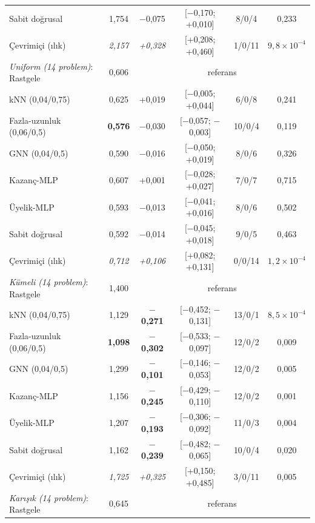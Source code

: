 \documentclass[pdflatex,sn-basic]{sn-jnl}
\newcommand{\iyi}[1]{\textcolor{iyiRenk}{\textbf{#1}}}
\newcommand{\kotu}[1]{\textcolor{kotuRenk}{\textit{#1}}}
\begin{document}
\begin{table}[!htbp]
\begin{tabular*}{\textwidth}{@{\extracolsep{\fill}}lccccc@{}}
\quad Sabit doğrusal & 1{,}754 & $-$0{,}075 & [$-$0{,}170; +0{,}010] & 8/0/4 & 0{,}233 \\
\quad Çevrimiçi (ılık) & \kotu{2{,}157} & \kotu{+0{,}328} & [+0{,}208; +0{,}460] & 1/0/11 & $9{,}8\times10^{-4}$ \\
\addlinespace
\textit{Uniform (14 problem)}: Rastgele & 0{,}606 & \multicolumn{4}{c}{referans} \\
\quad kNN (0,04/0,75) & 0{,}625 & +0{,}019 & [$-$0{,}005; +0{,}044] & 6/0/8 & 0{,}241 \\
\quad Fazla-uzunluk (0,06/0,5) & \iyi{0{,}576} & $-$0{,}030 & [$-$0{,}057; $-$0{,}003] & 10/0/4 & 0{,}119 \\
\quad GNN (0,04/0,5) & 0{,}590 & $-$0{,}016 & [$-$0{,}050; +0{,}019] & 8/0/6 & 0{,}326 \\
\quad Kazanç-MLP & 0{,}607 & +0{,}001 & [$-$0{,}028; +0{,}027] & 7/0/7 & 0{,}715 \\
\quad Üyelik-MLP & 0{,}593 & $-$0{,}013 & [$-$0{,}041; +0{,}016] & 8/0/6 & 0{,}502 \\
\quad Sabit doğrusal & 0{,}592 & $-$0{,}014 & [$-$0{,}045; +0{,}018] & 9/0/5 & 0{,}463 \\
\quad Çevrimiçi (ılık) & \kotu{0{,}712} & \kotu{+0{,}106} & [+0{,}082; +0{,}131] & 0/0/14 & $1{,}2\times10^{-4}$ \\
\addlinespace
\textit{Kümeli (14 problem)}: Rastgele & 1{,}400 & \multicolumn{4}{c}{referans} \\
\quad kNN (0,04/0,75) & 1{,}129 & \iyi{$-$0{,}271} & [$-$0{,}452; $-$0{,}131] & 13/0/1 & $8{,}5\times10^{-4}$ \\
\quad Fazla-uzunluk (0,06/0,5) & \iyi{1{,}098} & \iyi{$-$0{,}302} & [$-$0{,}533; $-$0{,}097] & 12/0/2 & 0{,}009 \\
\quad GNN (0,04/0,5) & 1{,}299 & \iyi{$-$0{,}101} & [$-$0{,}146; $-$0{,}053] & 12/0/2 & 0{,}005 \\
\quad Kazanç-MLP & 1{,}156 & \iyi{$-$0{,}245} & [$-$0{,}429; $-$0{,}110] & 12/0/2 & 0{,}001 \\
\quad Üyelik-MLP & 1{,}207 & \iyi{$-$0{,}193} & [$-$0{,}306; $-$0{,}092] & 11/0/3 & 0{,}004 \\
\quad Sabit doğrusal & 1{,}162 & \iyi{$-$0{,}239} & [$-$0{,}482; $-$0{,}065] & 10/0/4 & 0{,}020 \\
\quad Çevrimiçi (ılık) & \kotu{1{,}725} & \kotu{+0{,}325} & [+0{,}150; +0{,}485] & 3/0/11 & 0{,}005 \\
\addlinespace
\textit{Karışık (14 problem)}: Rastgele & 0{,}645 & \multicolumn{4}{c}{referans} \\

\end{tabular*}
\end{table}
\end{document}
